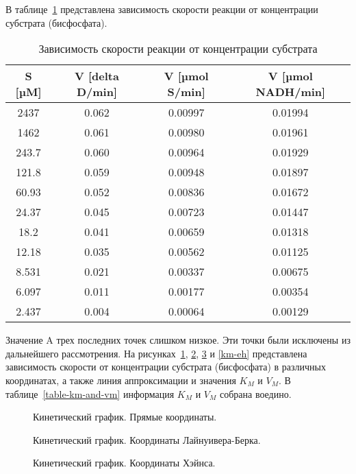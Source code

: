 В таблице~\ref{table-s-to-v} представлена зависимость скорости реакции
от концентрации субстрата (бисфосфата).

\begin{table}[htbp]
\caption{Зависимость скорости реакции от концентрации субстрата}
\begin{tabular}{|c|c|c|c|}
\hline
S [µM] &
V [delta D/min] &
V [µmol S/min] &
V [µmol NADH/min] \\
\hline
2437  & 0.062 &  0.00997 & 0.01994 \\
1462  & 0.061 &  0.00980 & 0.01961 \\
243.7 & 0.060 &  0.00964 & 0.01929 \\
121.8 & 0.059 &  0.00948 & 0.01897 \\
60.93 & 0.052 &  0.00836 & 0.01672 \\
24.37 & 0.045 &  0.00723 & 0.01447 \\
18.2  & 0.041 &  0.00659 & 0.01318 \\
12.18 & 0.035 &  0.00562 & 0.01125 \\
8.531 & 0.021 &  0.00337 & 0.00675 \\
6.097 & 0.011 &  0.00177 & 0.00354 \\
2.437 & 0.004 &  0.00064 & 0.00129 \\
\hline
\end{tabular}
\label{table-s-to-v}
\end{table}

Значение A трех последних точек слишком низкое.
Эти точки были исключены из дальнейшего рассмотрения.
На рисунках~\ref{km-direct}, \ref{km-reverse}, \ref{km-hanes} и \ref{km-eh}
представлена зависимость скорости от концентрации субстрата (бисфосфата)
в различных координатах, а также линия аппроксимации и значения $K_M$ и $V_M$.
В таблице~\ref{table-km-and-vm} информация $K_M$ и $V_M$ собрана воедино.

\begin{figure}[htbp]

\caption{Кинетический график.
    Прямые координаты.}
\label{km-direct}
\end{figure}

\begin{figure}[htbp]

\caption{Кинетический график.
    Координаты Лайнуивера-Берка.}
\label{km-reverse}
\end{figure}

\begin{figure}[htbp]

\caption{Кинетический график.
    Координаты Хэйнса.}
\label{km-hanes}
\end{figure}

